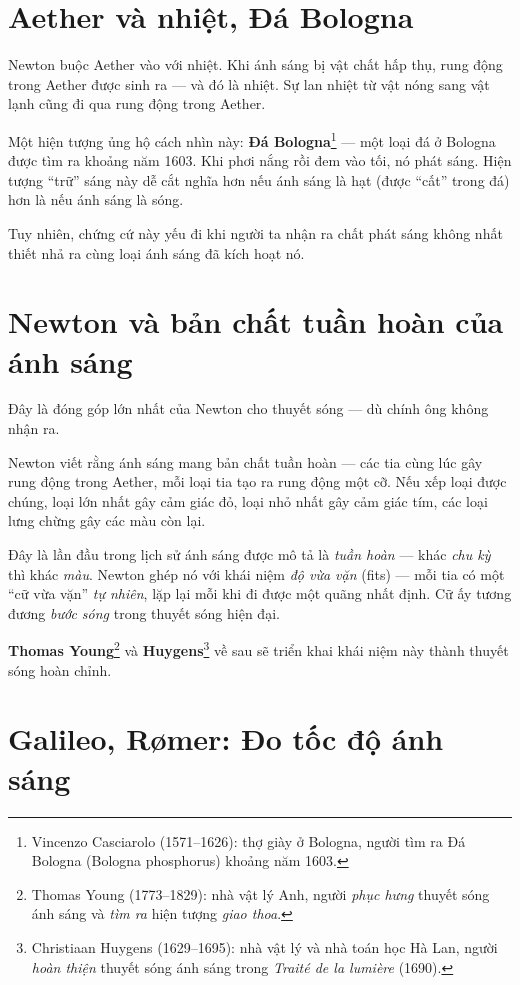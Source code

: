 \section{Aether và nhiệt, Đá Bologna}

Newton buộc Aether vào với nhiệt. Khi ánh sáng bị vật chất hấp thụ, rung động trong Aether được sinh ra — và đó là nhiệt. Sự lan nhiệt từ vật nóng sang vật lạnh cũng đi qua rung động trong Aether.

Một hiện tượng ủng hộ cách nhìn này: \textbf{Đá Bologna}\footnote{Vincenzo Casciarolo (1571--1626): thợ giày ở Bologna, người tìm ra Đá Bologna (Bologna phosphorus) khoảng năm 1603.} — một loại đá ở Bologna được tìm ra khoảng năm 1603. Khi phơi nắng rồi đem vào tối, nó phát sáng. Hiện tượng ``trữ'' sáng này dễ cắt nghĩa hơn nếu ánh sáng là hạt (được ``cất'' trong đá) hơn là nếu ánh sáng là sóng.

Tuy nhiên, chứng cứ này yếu đi khi người ta nhận ra chất phát sáng không nhất thiết nhả ra cùng loại ánh sáng đã kích hoạt nó.


\section{Newton và bản chất tuần hoàn của ánh sáng}

Đây là đóng góp lớn nhất của Newton cho thuyết sóng — dù chính ông không nhận ra.

Newton viết rằng ánh sáng mang bản chất tuần hoàn — các tia cùng lúc gây rung động trong Aether, mỗi loại tia tạo ra rung động một cỡ. Nếu xếp loại được chúng, loại lớn nhất gây cảm giác đỏ, loại nhỏ nhất gây cảm giác tím, các loại lưng chừng gây các màu còn lại.

Đây là lần đầu trong lịch sử ánh sáng được mô tả là \emph{tuần hoàn} — khác \emph{chu kỳ} thì khác \emph{màu}. Newton ghép nó với khái niệm \emph{độ vừa vặn} (fits) — mỗi tia có một ``cữ vừa vặn'' \emph{tự nhiên}, lặp lại mỗi khi đi được một quãng nhất định. Cữ ấy tương đương \emph{bước sóng} trong thuyết sóng hiện đại.

\textbf{Thomas Young}\footnote{Thomas Young (1773--1829): nhà vật lý Anh, người \emph{phục hưng} thuyết sóng ánh sáng và \emph{tìm ra} hiện tượng \emph{giao thoa}.} và \textbf{Huygens}\footnote{Christiaan Huygens (1629--1695): nhà vật lý và nhà toán học Hà Lan, người \emph{hoàn thiện} thuyết sóng ánh sáng trong \emph{Traité de la lumière} (1690).} về sau sẽ triển khai khái niệm này thành thuyết sóng hoàn chỉnh.


\section{Galileo, Rømer: Đo tốc độ ánh sáng}

